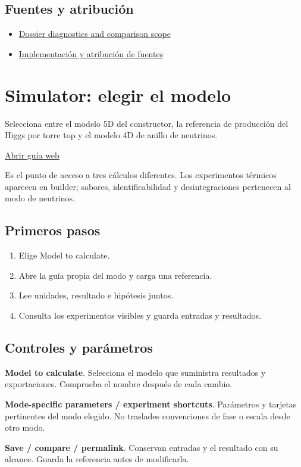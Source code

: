 \documentclass[11pt,a4paper]{article}
\begin{document}
\subsection*{Fuentes y atribución}
\begin{itemize}
\item \href{https://github.com/karlesmarin/ghu-lab/blob/main/src/modules/dossier.mjs}{Dossier diagnostics and comparison scope}
\item \href{https://github.com/karlesmarin/ghu-lab/blob/main/src/sections/dossier_section.js}{Implementación y atribución de fuentes}
\end{itemize}
\section{Simulator: elegir el modelo}
Selecciona entre el modelo 5D del constructor, la referencia de producción del Higgs por torre top y el modelo 4D de anillo de neutrinos.

\href{https://karlesmarin.github.io/ghu-explorer/guide/es/predict/index.html}{Abrir guía web}

Es el punto de acceso a tres cálculos diferentes. Los experimentos térmicos aparecen en builder; sabores, identificabilidad y desintegraciones pertenecen al modo de neutrinos.
\subsection*{Primeros pasos}
\begin{enumerate}
\item Elige Model to calculate.
\item Abre la guía propia del modo y carga una referencia.
\item Lee unidades, resultado e hipótesis juntos.
\item Consulta los experimentos visibles y guarda entradas y resultados.
\end{enumerate}
\subsection*{Controles y parámetros}
\textbf{Model to calculate}. Selecciona el modelo que suministra resultados y exportaciones. Comprueba el nombre después de cada cambio.

\textbf{Mode-specific parameters / experiment shortcuts}. Parámetros y tarjetas pertinentes del modo elegido. No traslades convenciones de fase o escala desde otro modo.

\textbf{Save / compare / permalink}. Conservan entradas y el resultado con su alcance. Guarda la referencia antes de modificarla.
\end{document}
